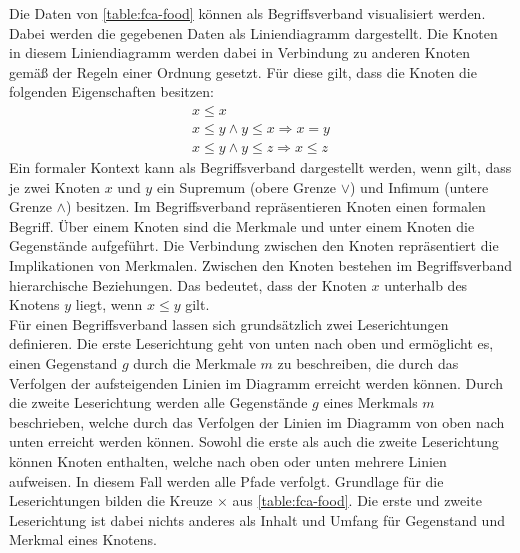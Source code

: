 Die Daten von \autoref{table:fca-food} können als Begriffsverband visualisiert werden.
Dabei werden die gegebenen Daten als Liniendiagramm dargestellt.
Die Knoten in diesem Liniendiagramm werden dabei in Verbindung zu anderen Knoten gemäß der Regeln einer Ordnung gesetzt.
Für diese gilt, dass die Knoten die folgenden Eigenschaften besitzen:
\begin{align}
    x \leq x \tag{reflexiv}                                       \\
    x \leq y \land y \leq x \Rightarrow x=y \tag{antisymmetrisch} \\
    x \leq y \land y \leq z \Rightarrow x\leq z \tag{transitiv}
\end{align}
Ein formaler Kontext kann als Begriffsverband dargestellt werden, wenn gilt, dass je zwei Knoten $x$ und $y$ ein Supremum (obere Grenze $\lor$) und Infimum (untere Grenze $\land$) besitzen.
Im Begriffsverband repräsentieren Knoten einen formalen Begriff.
Über einem Knoten sind die Merkmale und unter einem Knoten die Gegenstände aufgeführt.
Die Verbindung zwischen den Knoten repräsentiert die Implikationen von Merkmalen.
Zwischen den Knoten bestehen im Begriffsverband hierarchische Beziehungen.
Das bedeutet, dass der Knoten $x$ unterhalb des Knotens $y$ liegt, wenn $x \leq y$ gilt.\\

Für einen Begriffsverband lassen sich grundsätzlich zwei Leserichtungen definieren.
Die erste Leserichtung geht von unten nach oben und ermöglicht es, einen Gegenstand $g$ durch die Merkmale $m$ zu beschreiben, die durch das Verfolgen der aufsteigenden Linien im Diagramm erreicht werden können.
Durch die zweite Leserichtung werden alle Gegenstände $g$ eines Merkmals $m$ beschrieben, welche durch das Verfolgen der Linien im Diagramm von oben nach unten erreicht werden können.
Sowohl die erste als auch die zweite Leserichtung können Knoten enthalten, welche nach oben oder unten mehrere Linien aufweisen.
In diesem Fall werden alle Pfade verfolgt.
Grundlage für die Leserichtungen bilden die Kreuze $\times$ aus \autoref{table:fca-food}.
Die erste und zweite Leserichtung ist dabei nichts anderes als Inhalt und Umfang für Gegenstand und Merkmal eines Knotens.

\newpage

